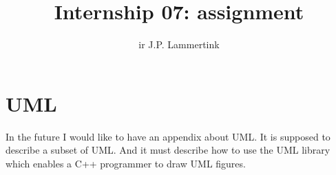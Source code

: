 \newcommand*{\BOOKCLASS}{}


\title{Internship 07: assignment}
\author{ir J.P. Lammertink}
\maketitle
\tableofcontents


\printbibliography[heading=bibintoc]

\appendix





\chapter{UML}
\label{sec:internship07.uml}
In the future I would like to have an appendix about UML.
It is supposed to describe a subset of UML. And it must describe
how to use the UML library which enables a C++ programmer to
draw UML figures.


\cleardoublepage
\printindex

